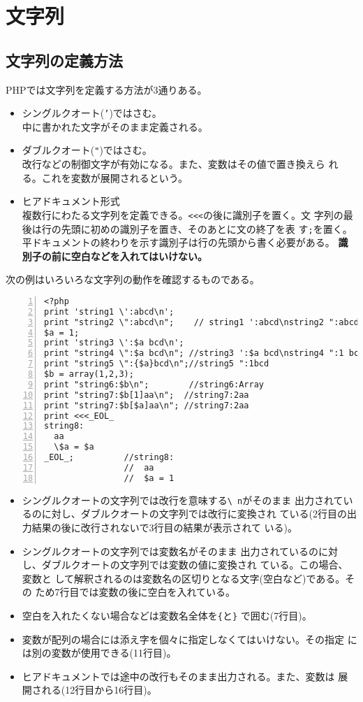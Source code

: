 \section{文字列}
\subsection{文字列の定義方法}PHPでは文字列を定義する方法が3通りある。
\begin{itemize}
 \item シングルクオート(\texttt{'})ではさむ。\\
   中に書かれた文字がそのまま定義される。
 \item ダブルクオート(\Verb+"+)ではさむ。%
       \\改行などの制御文字が有効になる。また、変数はその値で置き換えら
       れる。これを変数が展開されるという。
 \item ヒアドキュメント形式\\
   複数行にわたる文字列を定義できる。\texttt{<<<}の後に識別子を置く。文
       字列の最後は行の先頭に初めの識別子を置き、そのあとに文の終了を表
       す\texttt{;}を置く。平ドキュメントの終わりを示す識別子は行の先頭から書く必要がある。
       {\bfseries 識別子の前に空白などを入れてはいけない。}
\end{itemize}
\begin{Exec}\upshape
次の例はいろいろな文字列の動作を確認するものである。
\begin{Verbatim}[numbers=left]
<?php
print 'string1 \':abcd\n';
print "string2 \":abcd\n";    // string1 ':abcd\nstring2 ":abcd
$a = 1;
print 'string3 \':$a bcd\n';
print "string4 \":$a bcd\n"; //string3 ':$a bcd\nstring4 ":1 bcd
print "string5 \":{$a}bcd\n";//string5 ":1bcd
$b = array(1,2,3);
print "string6:$b\n";        //string6:Array
print "string7:$b[1]aa\n";  //string7:2aa
print "string7:$b[$a]aa\n"; //string7:2aa
print <<<_EOL_
string8:
  aa
  \$a = $a
_EOL_;          //string8:
                //  aa
                //  $a = 1
\end{Verbatim}
\begin{itemize}
 \item シングルクオートの文字列では改行を意味する\texttt{\textbackslash
       n}がそのまま
       出力されているのに対し、ダブルクオートの文字列では改行に変換され
       ている(2行目の出力結果の後に改行されないで3行目の結果が表示されて
       いる)。
 \item シングルクオートの文字列では変数名がそのまま
       出力されているのに対し、ダブルクオートの文字列では変数の値に変換され
       ている。この場合、変数と
       して解釈されるのは変数名の区切りとなる文字(空白など)である。その
       ため7行目では変数の後に空白を入れている。
 \item 空白を入れたくない場合などは変数名全体を\texttt{\{}と\texttt{\}}
       で囲む(7行目)。
 \item 変数が配列の場合には添え字を個々に指定しなくてはいけない。その指定
       には別の変数が使用できる(11行目)。
 \item ヒアドキュメントでは途中の改行もそのまま出力される。また、変数は
       展開される(12行目から16行目)。
\end{itemize}
\end{Exec}
